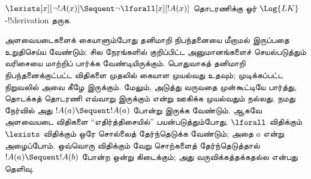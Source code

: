 \documentclass[../../../include/open-logic-section]{subfiles}
\begin{document}


\begin{ex}
$\lexists[x][\lnot !A(x)] \Sequent \lnot \lforall[x][!A(x)]$
தொடரணிக்கு ஓர் $\Log{LK}$-!!{derivation} தருக.

அளவையடைகளைக் கையாளும்போது தனிமாறி நிபந்தனையை மீறாமல் இருப்பதை உறுதிசெய்ய
வேண்டும்; சில நேரங்களில் குறிப்பிட்ட அனுமானங்களைச் செயல்படுத்தும் வரிசையை
மாற்றிப் பார்க்க வேண்டியிருக்கும். பொதுவாகத் தனிமாறி நிபந்தனைக்குட்பட்ட விதிகளை
முதலில் கையாள முயல்வது உதவும்; முடிக்கப்பட்ட நிறுவலில் அவை கீழே இருக்கும்.
மேலும், அடுத்து வருவதை முன்கூட்டியே பார்த்து, தொடக்கத் தொடரணி எவ்வாறு இருக்கும்
என்று ஊகிக்க முயல்வதும் நல்லது. நமது நேர்வில் அது $!A(a) \Sequent !A(a)$
போன்று இருக்க வேண்டும். ஆகவே அளவையடை விதிகளை ``எதிர்த்திசையில்''
பயன்படுத்தும்போது, $\lforall$ விதிக்கும் $\lexists$ விதிக்கும் ஒரே சொல்லைத்
தேர்ந்தெடுக்க வேண்டும்; அதை $a$ என்று அழைப்போம். ஒவ்வொரு விதிக்கும் வேறு
சொற்களைத் தேர்ந்தெடுத்தால் $!A(a) \Sequent !A(b)$ போன்ற ஒன்று கிடைக்கும்;
அது வருவிக்கத்தக்கதல்ல என்பது தெளிவு.


\end{ex}
\end{document}
